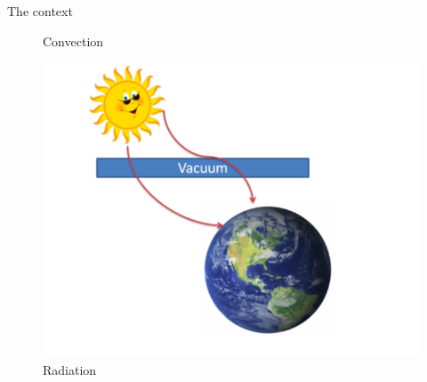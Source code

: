 \begin{frame}[allowframebreaks]{The context}
\begin{minipage}{0.30\linewidth}
\begin{figure}
        \caption{Convection}
    \end{figure}
\end{minipage}
\begin{minipage}{0.35\linewidth}
    \begin{figure}
        \centering
        \includegraphics[width=1.2\linewidth]{images/enkf/radiation.png}
        \caption{Radiation}
    \end{figure}
\end{minipage}

\end{frame}
